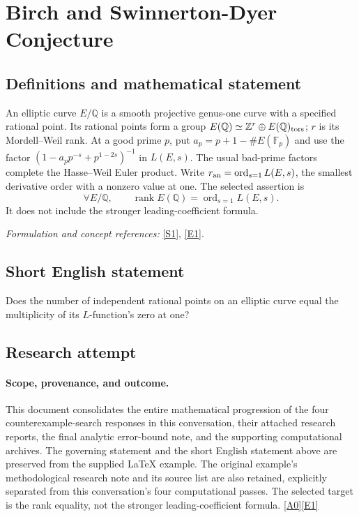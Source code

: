 \documentclass[11pt]{article}
\newcommand{\srcref}[1]{\hyperlink{source:#1}{[#1]}}
\begin{document}
\section*{\texorpdfstring{Birch and Swinnerton-Dyer Conjecture}{Birch and Swinnerton-Dyer Conjecture}}\label{5}
\subsection{Definitions and mathematical statement}
An elliptic curve $E/{\mathbb{Q}}$ is a smooth projective genus-one curve with a specified rational point. Its rational points form a group $E({\mathbb{Q}})\simeq{\mathbb{Z}}^r\oplus E({\mathbb{Q}})_{\rm tors}$; $r$ is its Mordell--Weil rank. At a good prime $p$, put $a_p=p+1-\#E({\mathbb{F}}_p)$ and use the factor $(1-a_pp^{-s}+p^{1-2s})^{-1}$ in $L(E,s)$. The usual bad-prime factors complete the Hasse--Weil Euler product. Write $r_{\rm an}=\operatorname{ord}_{s=1}L(E,s)$, the smallest derivative order with a nonzero value at one. The selected assertion is
\[
 \forall E/{\mathbb{Q}},\qquad \operatorname{rank}E({\mathbb{Q}})=\operatorname{ord}_{s=1}L(E,s).
\]
It does not include the stronger leading-coefficient formula.
\par\smallskip\textit{Formulation and concept references:} \href{https://www.claymath.org/library/monographs/MPPc.pdf}{[S1]}, \href{https://www.claymath.org/wp-content/uploads/2022/05/birchswin.pdf}{[E1]}.

\subsection{Short English statement}
Does the number of independent rational points on an elliptic curve equal the multiplicity of its $L$-function's zero at one?
\subsection{Research attempt}

\paragraph{Scope, provenance, and outcome.}
This document consolidates the entire mathematical progression of the four
counterexample-search responses in this conversation, their attached research
reports, the final analytic error-bound note, and the supporting computational
archives. The governing statement and the short English statement above are
preserved from the supplied LaTeX example. The original example's methodological
research note and its source list are also retained, explicitly separated from
this conversation's four computational passes. The selected target is the
rank equality, not the stronger leading-coefficient formula. \srcref{A0}\srcref{E1}
\end{document}

